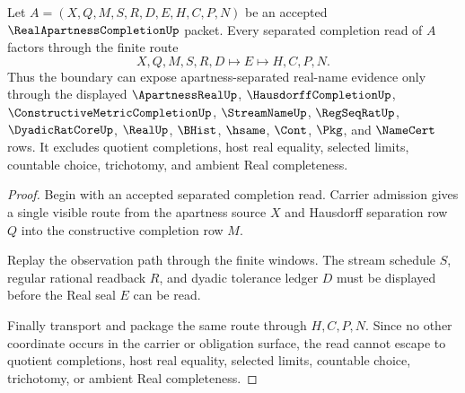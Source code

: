 \begin{theorem}
\label{thm:real-apartness-completion-nonescape}
Let $A=(X,Q,M,S,R,D,E,H,C,P,N)$ be an accepted $\RealApartnessCompletionUp$ packet. Every separated completion read of $A$ factors through the finite route
$$
X,Q,M,S,R,D \longmapsto E \longmapsto H,C,P,N .
$$
Thus the boundary can expose apartness-separated real-name evidence only through the displayed $\ApartnessRealUp$, $\HausdorffCompletionUp$, $\ConstructiveMetricCompletionUp$, $\StreamNameUp$, $\RegSeqRatUp$, $\DyadicRatCoreUp$, $\RealUp$, $\BHist$, $\hsame$, $\Cont$, $\Pkg$, and $\NameCert$ rows. It excludes quotient completions, host real equality, selected limits, countable choice, trichotomy, and ambient Real completeness.
\end{theorem}
\begin{proof}
Begin with an accepted separated completion read. Carrier admission gives a single visible route from the apartness source $X$ and Hausdorff separation row $Q$ into the constructive completion row $M$.

Replay the observation path through the finite windows. The stream schedule $S$, regular rational readback $R$, and dyadic tolerance ledger $D$ must be displayed before the Real seal $E$ can be read.

Finally transport and package the same route through $H,C,P,N$. Since no other coordinate occurs in the carrier or obligation surface, the read cannot escape to quotient completions, host real equality, selected limits, countable choice, trichotomy, or ambient Real completeness.
\end{proof}

